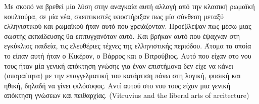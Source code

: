 Με σκοπό να βρεθεί μία λύση στην αναγκαία αυτή αλλαγή από την κλασική ρωμαϊκή κουλτούρα, σε μία νέα, σκεπτικιστές υποστήριξαν πως μία σύνθεση μεταξύ ελληνιστικού και ρωμαϊκού ήταν αυτό που χρειάζονταν. Προέβλεψαν πως μέσω μιας σωστής εκπαίδευσης θα επιτυγχανόταν αυτό. Και βρήκαν αυτό που έψαχναν στη εγκύκλιος παιδεία, τις ελευθέριες τέχνες της ελληνιστικής περιόδου. Άτομα τα οποία το είπαν αυτή ήταν ο Κικέρον, ο Βάρρος και ο Βιτρούβιος. Αυτό που είχαν στο νου τους ήταν μία γενική απόκτηση γνώσης για έναν επιστήμονα δεν είχε να κάνει (απαραίτητα) με την επαγγελματική του κατάρτιση πάνω στη λογική, φυσική και ηθική, δηλαδή να γίνει φιλόσοφος. Αντί αυτού στο νου τους είχαν μια γενική απόκτηση γνώσεων και πειθαρχίας. (Vitruvius and the liberal arts of arcitecture)












